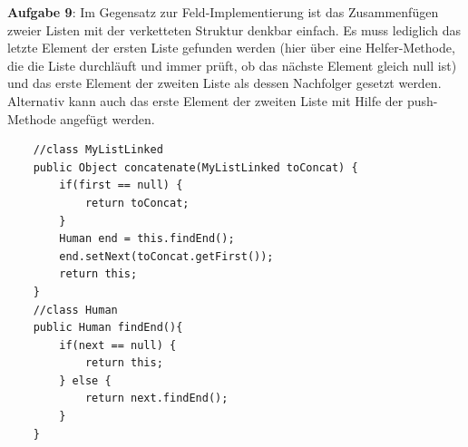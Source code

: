 \documentclass{article}
\begin{document}
\textbf{Aufgabe 9}:
Im Gegensatz zur Feld-Implementierung ist das Zusammenfügen zweier Listen mit der 
verketteten Struktur denkbar einfach. Es muss lediglich das letzte Element der ersten 
Liste gefunden werden (hier über eine Helfer-Methode, die die Liste durchläuft und 
immer prüft, ob das nächste Element gleich null ist) und das erste Element der zweiten Liste
als dessen Nachfolger gesetzt werden. Alternativ kann auch das erste Element der zweiten Liste mit 
Hilfe der push-Methode angefügt werden. 
\begin{verbatim}
    //class MyListLinked
    public Object concatenate(MyListLinked toConcat) {
        if(first == null) {
            return toConcat;
        }
        Human end = this.findEnd();
        end.setNext(toConcat.getFirst());
        return this;
    }
    //class Human
    public Human findEnd(){
        if(next == null) {
            return this;
        } else {
            return next.findEnd();
        }
    }
\end{verbatim}
\end{document}
